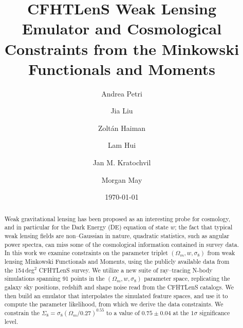 \documentclass[reprint,aps,prd,superscriptaddress,showkeys,showpacs]{revtex4-1}
\begin{document}
\title{CFHTLenS Weak Lensing Emulator and Cosmological Constraints from the Minkowski Functionals and Moments}

\author{Andrea Petri}

\author{Jia Liu}

\author{Zolt\'an Haiman}

\author{Lam Hui}

\author{Jan M. Kratochvil}

\author{Morgan May}

\date{\today}

\label{firstpage}

\begin{abstract}
Weak gravitational lensing has been proposed as an interesting probe for cosmology, and in particular for the Dark Energy (DE) equation of state $w$; the fact that typical weak lensing fields are non--Gaussian in nature, quadratic statistics, such as angular power spectra, can miss some of the cosmological information contained in survey data. In this work we examine constraints on the parameter triplet $(\Omega_m,w,\sigma_8)$ from weak lensing Minkowski Functionals and Moments, using the publicly available data from the 154\,deg$^2$ CFHTLenS survey. We utilize a new suite of ray--tracing N-body simulations spanning 91 points in the $(\Omega_m,w,\sigma_8)$ parameter space, replicating the galaxy sky positions, redshift and shape noise read from the CFHTLenS catalogs. We then build an emulator that interpolates the simulated feature spaces, and use it to compute the parameter likelihood, from which we derive the data constraints. We constrain the $\Sigma_8=\sigma_8(\Omega_m/0.27)^{0.55}$ to a value of $0.75\pm0.04$ at the $1\sigma$ significance level. 

\end{abstract}

\end{document}
